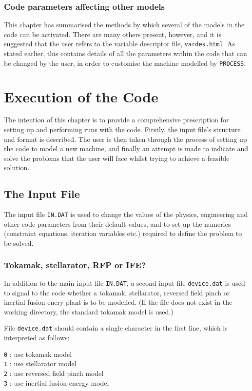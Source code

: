 \documentclass[11pt,a4paper]{report}
\newcommand{\process}{\mbox{\texttt{PROCESS}}}
\newcommand{\setheader}[1]
 {\markright{\rlap{\lower0.8ex\hbox to\textwidth{\hrulefill}}{\bf#1}}}
\newcommand{\mychapter}[1]{\small\normalsize
 \setcounter{footnote}{0}
 \chapter{#1}
 \pagestyle{myheadings}
 \setheader{Chapter \thechapter\hspace{0.8em}#1}}
\begin{document}
\subsection{Code parameters affecting other models}

This chapter has summarised the methods by which several of the models in the
code can be activated. There are many others present, however, and it is
suggested that the user refers to the variable descriptor file,
\texttt{vardes.html}. As stated earlier, this contains details of all the
parameters within the code that can be changed by the user, in order to
customise the machine modelled by \process.


\mychapter{Execution of the Code}
\label{chap:run}

The intention of this chapter is to provide a comprehensive prescription for
setting up and performing runs with the code.  Firstly, the input file's
structure and format is described. The user is then taken through the process
of setting up the code to model a new machine, and finally an attempt is made
to indicate and solve the problems that the user will face whilst trying to
achieve a feasible solution.

\section{The Input File}
\label{sec:infile}

The input file \texttt{IN.DAT} is used to change the values of the physics,
engineering and other code parameters from their default values, and to set up
the numerics (constraint equations, iteration variables etc.) required to
define the problem to be solved.

\subsection{Tokamak, stellarator, RFP or IFE?}

In addition to the main input file \texttt{IN.DAT}, a second input file
\texttt{device.dat} is used to signal to the code whether a tokamak,
stellarator, reversed field pinch or inertial fusion enery plant is to be
modelled. (If the file does not exist in the working directory, the standard
tokamak model is used.)

File \texttt{device.dat} should contain a single character in the first
line, which is interpreted as follows:
\begin{tabbing}
\hspace{15mm}\= \texttt{0} : use tokamak model \\
\> \texttt{1} : use stellarator model \\
\> \texttt{2} : use reversed field pinch model \\
\> \texttt{3} : use inertial fusion energy model
\end{tabbing}
\end{document}
